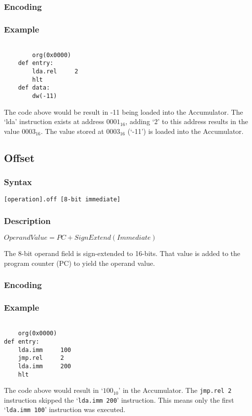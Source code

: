 \subsubsection{Encoding}
\subsubsection{Example}
\begin{verbatim}

        org(0x0000)
    def entry:
        lda.rel     2
        hlt
    def data:
        dw(-11)

\end{verbatim}
The code above would be result in -11 being loaded into the Accumulator.
The `lda' instruction exists at address $0001_{16}$, adding `2' to this address results in the value $0003_{16}$.
The value stored at $0003_{16}$ (`-11') is loaded into the Accumulator.
\pagebreak

\subsection{Offset}\label{subsec:relative-jump}
\subsubsection{Syntax}
\begin{verbatim}[operation].off [8-bit immediate]\end{verbatim}

\subsubsection{Description}
$OperandValue = PC + SignExtend(Immediate)$
\par The 8-bit operand field is sign-extended to 16-bits.
That value is added to the program counter (PC) to yield the operand value.

\subsubsection{Encoding}

\subsubsection{Example}
\begin{verbatim}

    org(0x0000)
def entry:
    lda.imm     100
    jmp.rel     2
    lda.imm     200
    hlt

\end{verbatim}
The code above would result in `$100_{10}$' in the Accumulator.
The \texttt{jmp.rel 2} instruction skipped the `\texttt{lda.imm 200}' instruction.
This means only the first `\texttt{lda.imm 100}' instruction was executed.
\pagebreak

